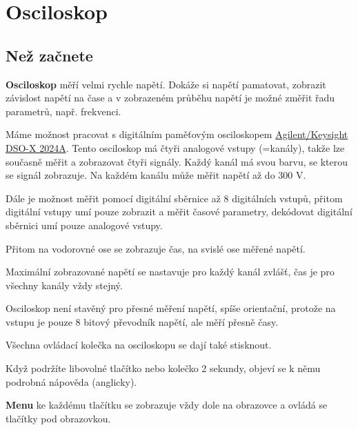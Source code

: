 

\section{Osciloskop} \label{osciloskop} 

\subsection{Než začnete}


\textbf{Osciloskop} měří velmi rychle napětí. Dokáže si napětí pamatovat, zobrazit závislost napětí na čase a v zobrazeném průběhu napětí je možné změřit řadu parametrů, např. frekvenci. 


Máme možnost pracovat s digitálním paměťovým osciloskopem
\href{https://www.keysight.com/en/pdx-x201837-pn-DSOX2024A/oscilloscope-200-mhz-4-analog-channels?nid=-32542.1150190\&cc=CZ\&lc=eng\&pm=ov}{Agilent/Keysight DSO-X 2024A}.
Tento osciloskop má čtyři analogové vstupy (=kanály), takže lze současně měřit a zobrazovat čtyři signály. Každý kanál má svou barvu, se kterou se signál zobrazuje. 
Na každém kanálu může měřit napětí až do 300 V. %

Dále je možnost měřit pomocí digitální sběrnice až 8 digitálních vstupů, přitom digitální vstupy umí pouze zobrazit a měřit časové parametry,  
dekódovat digitální sběrnici umí pouze analogové vstupy. 

Přitom na vodorovné ose se zobrazuje čas, na svislé ose měřené napětí. 

Maximální zobrazované napětí se nastavuje pro každý kanál zvlášť, čas je pro všechny kanály vždy stejný.  

Osciloskop není stavěný pro přesné měření napětí, spíše orientační, protože na vstupu je pouze 8 bitový převodník napětí, ale měří přesně časy.

Všechna ovládací kolečka na osciloskopu se dají také stisknout.

Když podržíte libovolné tlačítko nebo kolečko  2 sekundy, objeví se k němu podrobná nápověda (anglicky). 

\textbf{Menu}   ke každému tlačítku se zobrazuje vždy dole na obrazovce a ovládá se tlačítky pod obrazovkou. 
\label{menu:osc} 

